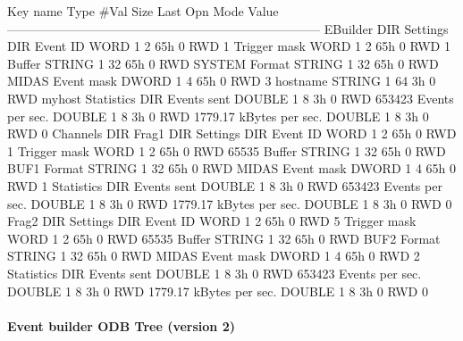 \begin{DoxyCode}
Key name                        Type    #Val  Size  Last Opn Mode Value
---------------------------------------------------------------------------
EBuilder                        DIR
    Settings                    DIR
        Event ID                WORD    1     2     65h  0   RWD  1
        Trigger mask            WORD    1     2     65h  0   RWD  1
        Buffer                  STRING  1     32    65h  0   RWD  SYSTEM
        Format                  STRING  1     32    65h  0   RWD  MIDAS
        Event mask              DWORD   1     4     65h  0   RWD  3
        hostname                STRING  1     64    3h   0   RWD  myhost
    Statistics                  DIR
        Events sent             DOUBLE  1     8     3h   0   RWD  653423
        Events per sec.         DOUBLE  1     8     3h   0   RWD  1779.17
        kBytes per sec.         DOUBLE  1     8     3h   0   RWD  0
    Channels                    DIR
        Frag1                   DIR
            Settings            DIR
                Event ID        WORD    1     2     65h  0   RWD  1
                Trigger mask    WORD    1     2     65h  0   RWD  65535
                Buffer          STRING  1     32    65h  0   RWD  BUF1
                Format          STRING  1     32    65h  0   RWD  MIDAS
                Event mask      DWORD   1     4     65h  0   RWD  1
            Statistics          DIR
                Events sent     DOUBLE  1     8     3h   0   RWD  653423
                Events per sec. DOUBLE  1     8     3h   0   RWD  1779.17
                kBytes per sec. DOUBLE  1     8     3h   0   RWD  0
        Frag2                   DIR
            Settings            DIR
                Event ID        WORD    1     2     65h  0   RWD  5
                Trigger mask    WORD    1     2     65h  0   RWD  65535
                Buffer          STRING  1     32    65h  0   RWD  BUF2
                Format          STRING  1     32    65h  0   RWD  MIDAS
                Event mask      DWORD   1     4     65h  0   RWD  2
            Statistics          DIR
                Events sent     DOUBLE  1     8     3h   0   RWD  653423
                Events per sec. DOUBLE  1     8     3h   0   RWD  1779.17
                kBytes per sec. DOUBLE  1     8     3h   0   RWD  0
\end{DoxyCode}
\hypertarget{FE_Event_Builder_FE_eb_tree_2}{}\paragraph{Event builder ODB Tree (version 2)}\label{FE_Event_Builder_FE_eb_tree_2}

